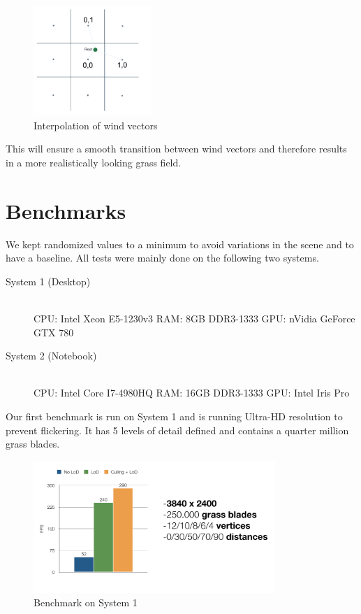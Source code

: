 \documentclass[conference]{acmsiggraph}
\begin{document}
 \begin{figure}[ht]
   \centering
   \includegraphics[width=1.75in]{images/wind_field_interpolation}
   \caption{Interpolation of wind vectors}
 \end{figure}

This will ensure a smooth transition between wind vectors and therefore results in a more realistically looking grass field.

\section{Benchmarks}
We kept randomized values to a minimum to avoid variations in the scene and to have a baseline. All tests were mainly done on the following two systems.

\begin{flushleft}
\begin{description}
  \item[System 1 (Desktop)] \hfill \\
  CPU: Intel Xeon E5-1230v3 \linebreak
  RAM: 8GB DDR3-1333 \linebreak
  GPU: nVidia GeForce GTX 780
  \item[System 2 (Notebook)] \hfill \\
  CPU: Intel Core I7-4980HQ \linebreak
  RAM: 16GB DDR3-1333 \linebreak
  GPU: Intel Iris Pro
\end{description}
\end{flushleft}

Our first benchmark is run on System 1 and is running Ultra-HD resolution to prevent flickering. It has 5 levels of detail defined and contains a quarter million grass blades.

 \begin{figure}[ht]
   \centering
   \includegraphics[width=3.6in]{images/benchmark1}
   \caption{Benchmark on System 1}
 \end{figure}    
\end{document}
